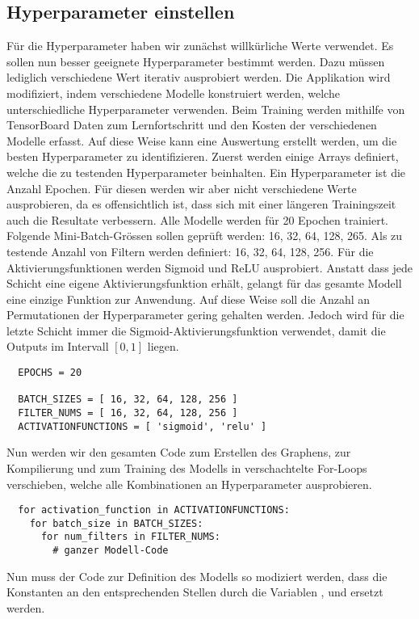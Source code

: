 \subsection{Hyperparameter einstellen}
Für die Hyperparameter haben wir zunächst willkürliche Werte verwendet. Es
sollen nun besser geeignete Hyperparameter bestimmt werden. Dazu müssen
lediglich verschiedene Wert iterativ ausprobiert werden.
Die Applikation wird modifiziert, indem verschiedene Modelle konstruiert werden,
welche unterschiedliche Hyperparameter verwenden.
Beim Training werden mithilfe von TensorBoard
Daten zum Lernfortschritt und den Kosten der verschiedenen Modelle erfasst. Auf
diese Weise kann eine Auswertung erstellt werden, um die besten Hyperparameter
zu identifizieren.
\para{}
Zuerst werden einige Arrays definiert, welche die zu testenden Hyperparameter beinhalten.
Ein Hyperparameter ist die Anzahl Epochen. Für diesen werden wir aber nicht
verschiedene Werte ausprobieren, da es offensichtlich ist, dass sich mit einer längeren Trainingszeit auch die
Resultate verbessern.
Alle Modelle werden für 20 Epochen trainiert.
\para{}
Folgende Mini-Batch-Grössen sollen geprüft werden: 16, 32, 64, 128, 265.
Als zu testende Anzahl von Filtern werden definiert: 16, 32, 64, 128, 256.
Für die Aktivierungsfunktionen werden Sigmoid und ReLU ausprobiert. Anstatt dass
jede Schicht eine eigene Aktivierungsfunktion erhält, gelangt für das gesamte
Modell eine einzige Funktion zur Anwendung. Auf diese Weise soll die Anzahl an
Permutationen der Hyperparameter gering gehalten werden.
Jedoch wird für die letzte Schicht immer die
Sigmoid-Aktivierungsfunktion verwendet, damit die Outputs im Intervall $[0,1]$
liegen.

\begin{verbatim}
  EPOCHS = 20

  BATCH_SIZES = [ 16, 32, 64, 128, 256 ]
  FILTER_NUMS = [ 16, 32, 64, 128, 256 ]
  ACTIVATIONFUNCTIONS = [ 'sigmoid', 'relu' ]
\end{verbatim}
Nun werden wir den gesamten Code zum Erstellen des Graphens, zur Kompilierung und
zum Training des Modells in verschachtelte For-Loops verschieben, welche alle
Kombinationen an Hyperparameter ausprobieren.

\begin{verbatim}
  for activation_function in ACTIVATIONFUNCTIONS:
    for batch_size in BATCH_SIZES:
      for num_filters in FILTER_NUMS:
        # ganzer Modell-Code
\end{verbatim}
Nun muss der Code zur Definition des Modells so modiziert werden, dass die
Konstanten an den entsprechenden Stellen durch die Variablen
,  und  ersetzt
werden.

